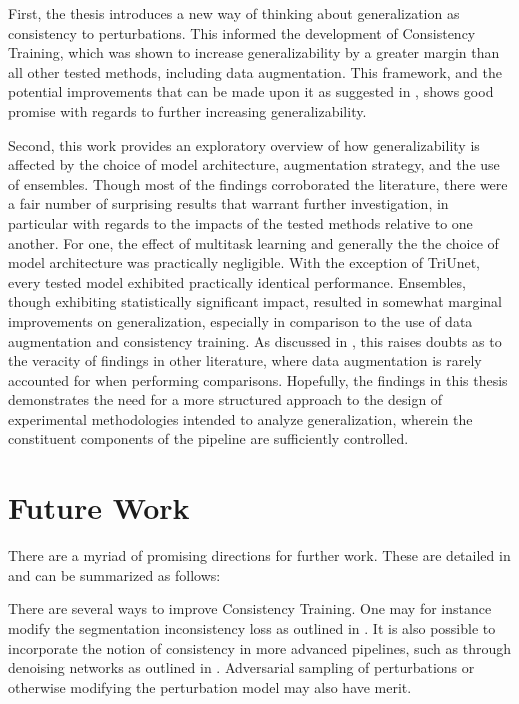 First, the thesis introduces a new way of thinking about generalization as consistency to perturbations. This informed the development of Consistency Training, which was shown to increase generalizability by a greater margin than all other tested methods, including data augmentation. This framework, and the potential improvements that can be made upon it as suggested in , shows good promise with regards to further increasing generalizability. 

Second, this work provides an exploratory overview of how generalizability is affected by the choice of model architecture, augmentation strategy, and the use of ensembles. Though most of the findings corroborated the literature, there were a fair number of surprising results that warrant further investigation, in particular with regards to the impacts of the tested methods relative to one another. For one, the effect of multitask learning and generally the the choice of model architecture was practically negligible. With the exception of TriUnet, every tested model exhibited practically identical performance. Ensembles, though exhibiting statistically significant impact, resulted in somewhat marginal improvements on generalization, especially in comparison to the use of data augmentation and consistency training. As discussed in , this raises doubts as to the veracity of findings in other literature, where data augmentation is rarely accounted for when performing comparisons. Hopefully, the findings in this thesis demonstrates the need for a more structured approach to the design of experimental methodologies intended to analyze generalization, wherein the constituent components of the pipeline are sufficiently controlled. 

\section{Future Work}
There are a myriad of promising directions for further work. These are detailed in  and can be summarized as follows:

There are several ways to improve Consistency Training. One may for instance modify the segmentation inconsistency loss as outlined in . It is also possible to incorporate the notion of consistency in more advanced pipelines, such as through denoising networks as outlined in . Adversarial sampling of perturbations or otherwise modifying the perturbation model may also have merit.  

